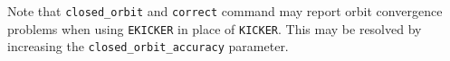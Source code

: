 Note that \verb|closed_orbit| and \verb|correct| command may report orbit convergence problems 
when using \verb|EKICKER| in place of \verb|KICKER|. This may be resolved by increasing the
\verb|closed_orbit_accuracy| parameter.
